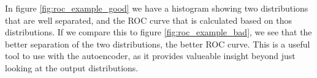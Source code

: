 In figure \ref{fig:roc_example_good} we have a histogram showing two distributions that are well separated, and the ROC curve that is calculated 
based on thos distributions. If we compare this to figure \ref{fig:roc_example_bad}, we see that the better separation of the two distributions, the better ROC curve. 
This is a useful tool to use with the autoencoder, as it provides valueable insight beyond just looking at the output distributions. 